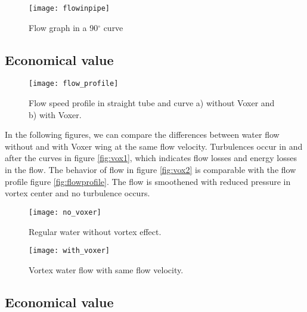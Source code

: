 \begin{figure}[h]
  \centering
  \texttt{[image: flowinpipe]}
  \caption{ Flow graph in a 90$^{\circ}$ curve\cite{voxer:article}}
  \label{fig:flow}
\end{figure}
\subsection{Economical value}
\begin{figure}[h]
  \centering
  \texttt{[image: flow\_profile]}
  \caption{ Flow speed profile in straight tube and curve \newline a) without Voxer and b) with Voxer. \cite{voxer:article}}
  \label{fig:flowprofile}
\end{figure}

In the following figures, we can compare the differences between water flow without and with Voxer wing at the same flow velocity. Turbulences occur in and after the curves in figure \vref{fig:vox1}, which indicates flow losses and energy losses in the flow. The behavior of flow in figure \vref{fig:vox2} is comparable with the flow profile figure \vref{fig:flowprofile}. The flow is smoothened with reduced pressure in vortex center and no turbulence occurs.
\begin{figure}[h]
  \centering
  \texttt{[image: no\_voxer]}
  \caption{ Regular water without vortex effect.\cite{voxer:article}}
  \label{fig:vox1}
\end{figure}
\begin{figure}[h]
  \centering
  \texttt{[image: with\_voxer]}
  \caption{ Vortex water flow with same flow velocity.\cite{voxer:article}}
  \label{fig:vox2}
\end{figure}

\subsection{Economical value}

